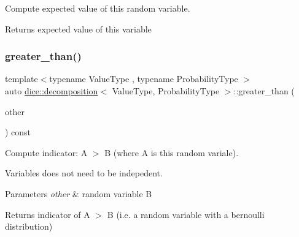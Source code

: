 Compute expected value of this random variable. 

\begin{DoxyReturn}{Returns}
expected value of this variable 
\end{DoxyReturn}
\mbox{\label{classdice_1_1decomposition_abede851d76806d165ed11861c8ef33ea}} 
\subsubsection{\texorpdfstring{greater\+\_\+than()}{greater\_than()}}
{\footnotesize\ttfamily template$<$typename Value\+Type , typename Probability\+Type $>$ \\
auto \mbox{\hyperlink{classdice_1_1decomposition}{dice\+::decomposition}}$<$ Value\+Type, Probability\+Type $>$\+::greater\+\_\+than (\begin{DoxyParamCaption}\item[{const \mbox{\hyperlink{classdice_1_1decomposition}{decomposition}}$<$ Value\+Type, Probability\+Type $>$ \&}]{other }\end{DoxyParamCaption}) const\hspace{0.3cm}{\ttfamily [inline]}}



Compute indicator\+: A $>$ B (where A is this random variale). 

Variables does not need to be indepedent.


\begin{DoxyParams}{Parameters}
{\em other} & random variable B\\
\hline
\end{DoxyParams}
\begin{DoxyReturn}{Returns}
indicator of A $>$ B (i.\+e. a random variable with a bernoulli distribution) 
\end{DoxyReturn}
\mbox{\label{classdice_1_1decomposition_a0f65f2184d050b75bc45b13e5b01b53b}} 
